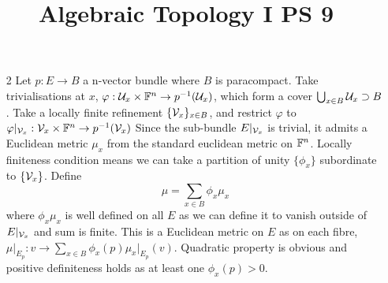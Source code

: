 \documentclass[10pt,a4paper]{article}
\title{Algebraic Topology I PS 9}
\begin{document}
\maketitle
\begin{enumerate}
\item[2] Let $p:E\to B$ a n-vector bundle where $B$ is paracompact. Take trivialisations at $x$, $\varphi:\mathcal{U}_x\times \mathbb{F}^n\to p^{-1}(\mathcal{U}_x)$, which form a cover  $\bigcup_{x\in B} \mathcal{U}_x\supset B$. Take a locally finite refinement $\{\mathcal{V}_x\}_{x\in B}$, and restrict $\varphi$ to $\varphi\vert_{\mathcal{V}_x}:\mathcal{V}_x\times \mathbb{F}^n\to p^{-1}(\mathcal{V}_x)$
Since the sub-bundle $E\vert_{\mathcal{V}_x}$ is trivial, it admits a Euclidean metric $\mu_x$ from the standard euclidean metric on $\mathbb{F}^n$. 
Locally finiteness condition means we can take a partition of unity $\{\phi_x\}$ subordinate to $\{\mathcal{V}_x\}$. Define 
\[\mu=\sum_{x\in B} \phi_x \mu_x\] 
where $\phi_x\mu_x$ is well defined on all $E$ as we can define it to vanish outside of $E\vert_{\mathcal{V}_x}$ and sum is finite. This is a Euclidean metric on $E$ as on each fibre,
$\mu\vert_{E_p}:v\to \sum_{x\in B}\phi_x(p) \mu_x\vert_{E_p}(v)$. Quadratic property is obvious and positive definiteness holds as at least one $\phi_x(p) >0$.
\end{enumerate}
\end{document}
